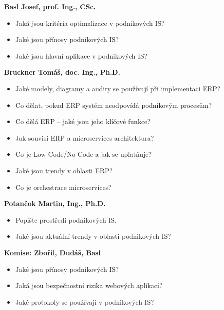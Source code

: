 \begin{profesorbox}
\textbf{Basl Josef, prof. Ing., CSc.}
\begin{itemize}
  \item Jaká jsou kritéria optimalizace v podnikových IS?
  \item Jaké jsou přínosy podnikových IS?
  \item Jaké jsou hlavní aplikace v podnikových IS?
\end{itemize}
\textbf{Bruckner Tomáš, doc. Ing., Ph.D.}
\begin{itemize}
  \item Jaké modely, diagramy a audity se používají při implementaci ERP?
  \item Co dělat, pokud ERP systém neodpovídá podnikovým procesům?
  \item Co dělá ERP -- jaké jsou jeho klíčové funkce?
  \item Jak souvisí ERP a microservices architektura?
  \item Co je Low Code/No Code a jak se uplatňuje?
  \item Jaké jsou trendy v oblasti ERP?
  \item Co je orchestrace microservices?
\end{itemize}
\textbf{Potančok Martin, Ing., Ph.D.}
\begin{itemize}
  \item Popište prostředí podnikových IS.
  \item Jaké jsou aktuální trendy v oblasti podnikových IS?
\end{itemize}
\textbf{Komise: Zbořil, Dudáš, Basl}
\begin{itemize}
  \item Jaké jsou přínosy podnikových IS?
  \item Jaká jsou bezpečnostní rizika webových aplikací?
  \item Jaké protokoly se používají v podnikových IS?
\end{itemize}
\end{profesorbox}
